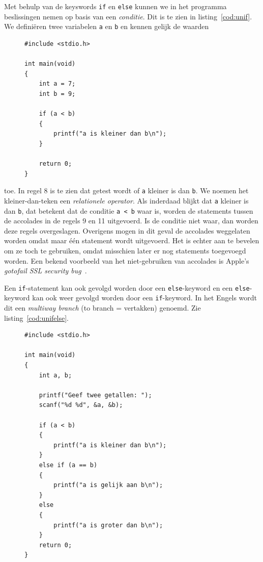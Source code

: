 Met behulp van de keyswords \texttt{if} en \texttt{else} kunnen we in het programma beslissingen nemen op basis van een \textsl{conditie}. Dit is te zien in listing~\ref{cod:unif}. We definiëren twee variabelen \texttt{a} en \texttt{b} en kennen gelijk de waarden 
%
\begin{figure}[!b]
\begin{lstlisting}[caption=Afdrukken van tekst op basis van een beslissing.,label=cod:unif]
#include <stdio.h>

int main(void)
{
    int a = 7;
    int b = 9;
    
    if (a < b)
    {
        printf("a is kleiner dan b\n");
    }
    
    return 0;
}
\end{lstlisting}
\end{figure}
%
toe. In regel 8 is te zien dat getest wordt of \texttt{a} kleiner is dan \texttt{b}. We noemen het kleiner-dan-teken een \textsl{relationele operator}. Als inderdaad blijkt dat \texttt{a} kleiner is dan \texttt{b}, dat betekent dat de conditie \texttt{a < b} waar is, worden de statements tussen de accolades in de regels 9 en 11 uitgevoerd. Is de conditie niet waar, dan worden deze regels overgeslagen. Overigens mogen in dit geval de accolades weggelaten worden omdat maar één statement wordt uitgevoerd. Het is echter aan te bevelen om ze toch te gebruiken, omdat misschien later er nog statements toegevoegd worden. Een bekend voorbeeld van het niet-gebruiken van accolades is Apple's \textsl{gotofail SSL security bug}~\cite{barr2014}.


Een \texttt{if}-statement kan ook gevolgd worden door een \texttt{else}-keyword en een \texttt{else}-keyword kan ook weer gevolgd worden door een \texttt{if}-keyword. In het Engels wordt dit een \textsl{multiway branch} (to branch = vertakken) genoemd. Zie listing~\ref{cod:unifelse}.

\begin{figure}[!ht]
\begin{lstlisting}[caption=Afdrukken van tekst op basis van een beslissing.,label=cod:unifelse]
#include <stdio.h>

int main(void)
{
    int a, b;
    
    printf("Geef twee getallen: ");
    scanf("%d %d", &a, &b);
    
    if (a < b)
    {
        printf("a is kleiner dan b\n");
    }
    else if (a == b) 
    {
        printf("a is gelijk aan b\n");
    }
    else
    {
        printf("a is groter dan b\n");
    }
    return 0;
}
\end{lstlisting}
\end{figure}

